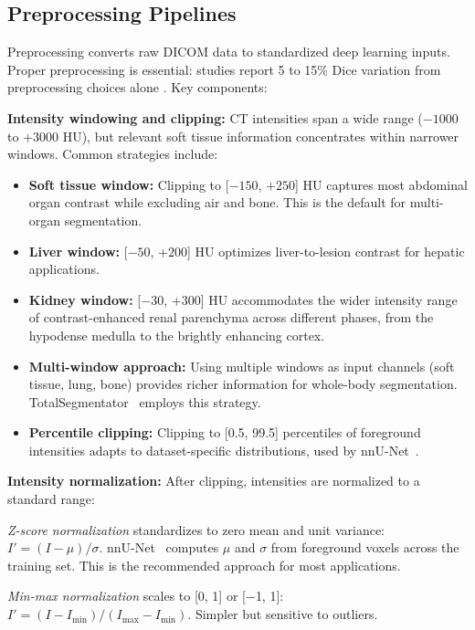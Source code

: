 \documentclass[conference]{IEEEtran}
\begin{document}
\subsection{Preprocessing Pipelines}
\label{sec:preprocessing}

Preprocessing converts raw DICOM data to standardized deep learning inputs. Proper preprocessing is essential: studies report 5 to 15\% Dice variation from preprocessing choices alone \cite{isensee2021nnunet}. Key components:

\textbf{Intensity windowing and clipping:} CT intensities span a wide range ($-1000$ to $+3000$ HU), but relevant soft tissue information concentrates within narrower windows. Common strategies include:

\begin{itemize}
    \item \textbf{Soft tissue window:} Clipping to [$-150$, $+250$] HU captures most abdominal organ contrast while excluding air and bone. This is the default for multi-organ segmentation.
    \item \textbf{Liver window:} [$-50$, $+200$] HU optimizes liver-to-lesion contrast for hepatic applications.
    \item \textbf{Kidney window:} [$-30$, $+300$] HU accommodates the wider intensity range of contrast-enhanced renal parenchyma across different phases, from the hypodense medulla to the brightly enhancing cortex.
    \item \textbf{Multi-window approach:} Using multiple windows as input channels (soft tissue, lung, bone) provides richer information for whole-body segmentation. TotalSegmentator~\cite{wasserthal2023totalsegmentator} employs this strategy.
    \item \textbf{Percentile clipping:} Clipping to [0.5, 99.5] percentiles of foreground intensities adapts to dataset-specific distributions, used by nnU-Net~\cite{isensee2021nnunet}.
\end{itemize}

\textbf{Intensity normalization:} After clipping, intensities are normalized to a standard range:

\emph{Z-score normalization} standardizes to zero mean and unit variance: $I' = (I - \mu) / \sigma$. nnU-Net~\cite{isensee2021nnunet} computes $\mu$ and $\sigma$ from foreground voxels across the training set. This is the recommended approach for most applications.

\emph{Min-max normalization} scales to [0, 1] or [$-$1, 1]: $I' = (I - I_{\min}) / (I_{\max} - I_{\min})$. Simpler but sensitive to outliers.
\end{document}

